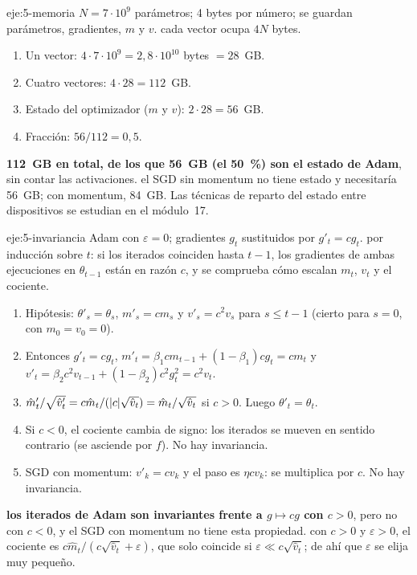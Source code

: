 \begin{solucion}{eje:5-memoria}
\datos $N=7\cdot 10^{9}$ parámetros; 4 bytes por número; se guardan parámetros, gradientes, $m$ y $v$.
\planteamiento cada vector ocupa $4N$ bytes.
\pasos
\begin{enumerate}[label=\arabic*.]
  \item Un vector: $4\cdot 7\cdot 10^{9}=2{,}8\cdot 10^{10}$ bytes $=28$~GB.
  \item Cuatro vectores: $4\cdot 28=112$~GB.
  \item Estado del optimizador ($m$ y $v$): $2\cdot 28=56$~GB.
  \item Fracción: $56/112=0{,}5$.
\end{enumerate}
\resultado \textbf{112~GB en total, de los que 56~GB (el 50~\%) son el estado de Adam}, sin contar las activaciones.
\comprobacion el SGD sin momentum no tiene estado y necesitaría 56~GB; con momentum, 84~GB. Las técnicas de reparto del estado entre dispositivos se estudian en el módulo~17.
\end{solucion}

\begin{solucion}{eje:5-invariancia}
\datos Adam con $\varepsilon=0$; gradientes $g_t$ sustituidos por $g'_t=cg_t$.
\planteamiento por inducción sobre $t$: si los iterados coinciden hasta $t-1$, los gradientes de ambas ejecuciones en $\theta_{t-1}$ están en razón $c$, y se comprueba cómo escalan $m_t$, $v_t$ y el cociente.
\pasos
\begin{enumerate}[label=\arabic*.]
  \item Hipótesis: $\theta'_s=\theta_s$, $m'_s=cm_s$ y $v'_s=c^{2}v_s$ para $s\le t-1$ (cierto para $s=0$, con $m_0=v_0=0$).
  \item Entonces $g'_t=cg_t$, $m'_t=\beta_1cm_{t-1}+(1-\beta_1)cg_t=cm_t$ y $v'_t=\beta_2c^{2}v_{t-1}+(1-\beta_2)c^{2}g_t^{2}=c^{2}v_t$.
  \item $\hat m'_t/\sqrt{\hat v'_t}=c\hat m_t/(\lvert c\rvert\sqrt{\hat v_t})=\hat m_t/\sqrt{\hat v_t}$ si $c>0$. Luego $\theta'_t=\theta_t$.
  \item Si $c<0$, el cociente cambia de signo: los iterados se mueven en sentido contrario (se asciende por $f$). No hay invariancia.
  \item SGD con momentum: $v'_k=cv_k$ y el paso es $\eta cv_k$: se multiplica por $c$. No hay invariancia.
\end{enumerate}
\resultado \textbf{los iterados de Adam son invariantes frente a $g\mapsto cg$ con $c>0$}, pero no con $c<0$, y el SGD con momentum no tiene esta propiedad.
\comprobacion con $c>0$ y $\varepsilon>0$, el cociente es $c\hat m_t/(c\sqrt{\hat v_t}+\varepsilon)$, que solo coincide si $\varepsilon\ll c\sqrt{\hat v_t}$; de ahí que $\varepsilon$ se elija muy pequeño.
\end{solucion}

